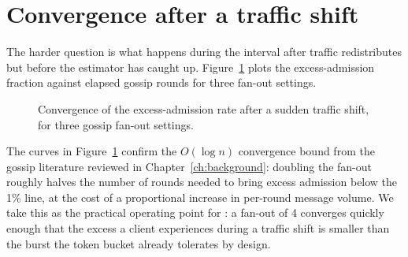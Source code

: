 \section{Convergence after a traffic shift}

The harder question is what happens during the interval after traffic redistributes but
before the estimator has caught up. Figure~\ref{fig:latency} plots the excess-admission
fraction against elapsed gossip rounds for three fan-out settings.

\begin{figure}[ht]
  \centering
  \caption{Convergence of the excess-admission rate after a sudden traffic shift, for
    three gossip fan-out settings.}
  \label{fig:latency}
\end{figure}

The curves in Figure~\ref{fig:latency} confirm the $O(\log n)$ convergence bound from the
gossip literature reviewed in Chapter~\ref{ch:background}: doubling the fan-out roughly
halves the number of rounds needed to bring excess admission below the 1\% line, at the
cost of a proportional increase in per-round message volume. We take this as the practical
operating point for \sysname{}: a fan-out of 4 converges quickly enough that the excess a
client experiences during a traffic shift is smaller than the burst the token bucket already
tolerates by design.

